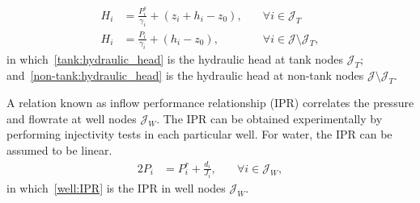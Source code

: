     \begin{subequations}
        \begin{alignat}{2}
            H_i &= \frac{P_i^s}{\gamma_i} + \left(z_i + h_i - z_0 \right), &\quad \forall i \in \mathcal{J}_T \label{tank:hydraulic_head}
            \\ 
            H_i &= \frac{P_i}{\gamma_i} + \left(h_i - z_0 \right), &\quad \forall i \in \mathcal{J}\setminus\mathcal{J}_T, \label{non-tank:hydraulic_head}
        \end{alignat}    
    \end{subequations}
    in which~\eqref{tank:hydraulic_head} is the hydraulic head at tank nodes $\mathcal{J}_T$; and~\eqref{non-tank:hydraulic_head} is the hydraulic head at non-tank nodes $\mathcal{J}\setminus\mathcal{J}_T$. 
    \par A relation known as inflow performance relationship (IPR) correlates the pressure and flowrate at well nodes $\mathcal{J}_W$. The IPR can be obtained experimentally by performing injectivity tests in each particular well. For water, the IPR can be assumed to be linear.
    \begin{alignat}{2}
        P_i & = P^r_i + \frac{d_i}{J_i}, & \quad \forall i \in \mathcal{J}_W, \label{well:IPR}
    \end{alignat}
    in which~\eqref{well:IPR} is the IPR in well nodes $\mathcal{J}_W$.

